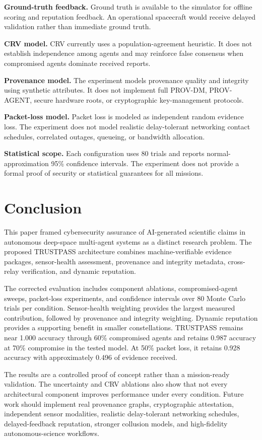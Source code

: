\documentclass[10pt,conference]{IEEEtran}
\begin{document}
\textbf{Ground-truth feedback.}
Ground truth is available to the simulator for offline scoring and reputation feedback. An operational spacecraft would receive delayed validation rather than immediate ground truth.

\textbf{CRV model.}
CRV currently uses a population-agreement heuristic. It does not establish independence among agents and may reinforce false consensus when compromised agents dominate received reports.

\textbf{Provenance model.}
The experiment models provenance quality and integrity using synthetic attributes. It does not implement full PROV-DM, PROV-AGENT, secure hardware roots, or cryptographic key-management protocols.

\textbf{Packet-loss model.}
Packet loss is modeled as independent random evidence loss. The experiment does not model realistic delay-tolerant networking contact schedules, correlated outages, queueing, or bandwidth allocation.

\textbf{Statistical scope.}
Each configuration uses 80 trials and reports normal-approximation 95\% confidence intervals. The experiment does not provide a formal proof of security or statistical guarantees for all missions.

\section{Conclusion}
\label{sec:conclusion}

This paper framed cybersecurity assurance of AI-generated scientific claims in autonomous deep-space multi-agent systems as a distinct research problem. The proposed TRUSTPASS architecture combines machine-verifiable evidence packages, sensor-health assessment, provenance and integrity metadata, cross-relay verification, and dynamic reputation.

The corrected evaluation includes component ablations, compromised-agent sweeps, packet-loss experiments, and confidence intervals over 80 Monte Carlo trials per condition. Sensor-health weighting provides the largest measured contribution, followed by provenance and integrity weighting. Dynamic reputation provides a supporting benefit in smaller constellations. TRUSTPASS remains near 1.000 accuracy through 60\% compromised agents and retains 0.987 accuracy at 70\% compromise in the tested model. At 50\% packet loss, it retains 0.928 accuracy with approximately 0.496 of evidence received.

The results are a controlled proof of concept rather than a mission-ready validation. The uncertainty and CRV ablations also show that not every architectural component improves performance under every condition. Future work should implement real provenance graphs, cryptographic attestation, independent sensor modalities, realistic delay-tolerant networking schedules, delayed-feedback reputation, stronger collusion models, and high-fidelity autonomous-science workflows.
\end{document}
